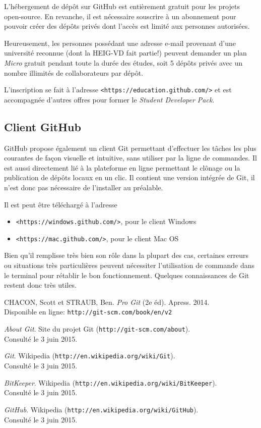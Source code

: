 \documentclass[11pt,a4paper]{article}
\begin{document}
L'hébergement de dépôt sur GitHub est entièrement gratuit pour les projets open-source.
En revanche, il est nécessaire souscrire à un abonnement pour pouvoir créer des dépôts privés dont l'accès est limité aux personnes autorisées.

Heureusement, les personnes possédant une adresse e-mail provenant d'une université reconnue (dont la HEIG-VD fait partie!) peuvent demander un plan \textit{Micro} gratuit pendant toute la durée des études, soit 5 dépôts privés avec un nombre illimités de collaborateurs par dépôt.

L'inscription se fait à l'adresse {\tt <https://education.github.com/>} et est accompagnée d'autres offres pour former le {\it Student Developer Pack}.

\subsection{Client GitHub}

GitHub propose également un client Git permettant d'effectuer les tâches les plus courantes de façon visuelle et intuitive, sans utiliser par la ligne de commandes.
Il est aussi directement lié à la plateforme en ligne permettant le clônage ou la publication de dépôts locaux en un clic.
Il contient une version intégrée de Git, il n'est donc pas nécessaire de l'installer au préalable.

Il est peut être téléchargé à l'adresse

\begin{itemize}
	\item {\tt <https://windows.github.com/>}, pour le client Windows
	\item {\tt <https://mac.github.com/>}, pour le client Mac OS
\end{itemize}

Bien qu'il remplisse très bien son rôle dans la plupart des cas, certaines erreurs ou situations très particulières peuvent nécessiter l'utilisation de commande dans le terminal pour rétablir le bon fonctionnement.
Quelques connaissances de Git restent donc très utiles.

\pagebreak
\begin{thebibliography}{1}

	CHACON, Scott et STRAUB, Ben. {\em Pro Git} (2e éd). Apress. 2014. \\
	Disponible en ligne: {\tt http://git-scm.com/book/en/v2}

	{\em About Git}. Site du projet Git ({\tt http://git-scm.com/about}). \\
	Consulté le 3 juin 2015.

	{\em Git}. Wikipedia ({\tt http://en.wikipedia.org/wiki/Git}). \\
	Consulté le 3 juin 2015.

	{\em BitKeeper}. Wikipedia ({\tt http://en.wikipedia.org/wiki/BitKeeper}). \\
	Consulté le 3 juin 2015.

	{\em GitHub}. Wikipedia ({\tt http://en.wikipedia.org/wiki/GitHub}). \\
	Consulté le 3 juin 2015.
	
\end{thebibliography}
\end{document}
